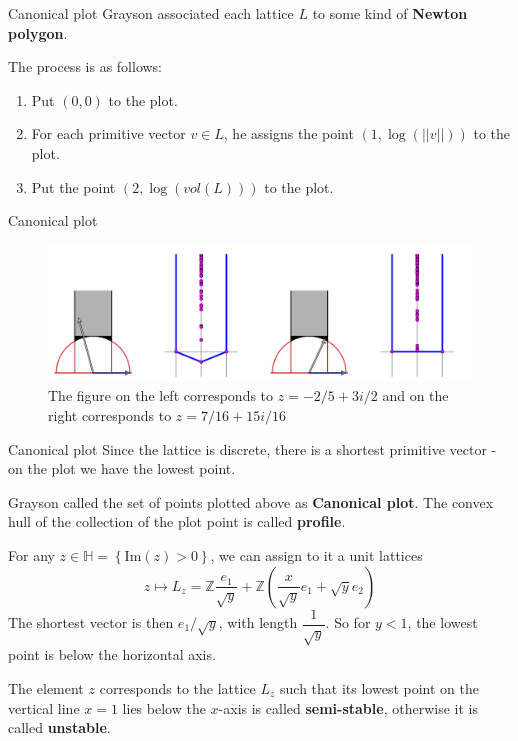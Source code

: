 \documentclass[pdf]{beamer}
\begin{document}
\begin{frame}{Canonical plot}
    Grayson associated each lattice $L$ to some kind of \textbf{Newton polygon}. \pause

    The process is as follows:
    \begin{enumerate}
        \item Put $(0,0)$ to the plot.
        \item For each primitive vector $v \in L$, he assigns the point $(1,\log(||v||))$ to the plot.
        \item Put the point $(2,\log(vol(L)))$ to the plot.
    \end{enumerate}
\end{frame}
\begin{frame}{Canonical plot}
    \begin{figure}[h]
        \includegraphics[width = \textwidth]{Canonical plot.png}
        \caption{The figure on the left corresponds to $z = -2/5 +3i/2$ and on the right corresponds to $z = 7/16+15i/16$}
    \end{figure}
\end{frame}
\begin{frame}{Canonical plot}
    Since the lattice is discrete, there is a shortest primitive vector - on the plot we have the lowest point.\pause\vspace{3em}

    Grayson called the set of points plotted above as \textbf{Canonical plot}. The convex hull of the collection
    of the plot point is called \textbf{profile}.
\end{frame}
\begin{frame}
    For any $z \in \mathbb{H} = \left\lbrace \text{Im}(z)>0 \right\rbrace$, we can assign to it a unit lattices
    \[z \mapsto L_z = \mathbb{Z}\dfrac{e_1}{\sqrt{y}} + \mathbb{Z}\left(\dfrac{x}{\sqrt{y}}e_1+\sqrt{y}e_2 \right)\]
    The shortest vector is then $ e_1/\sqrt{y}$, with length $\dfrac{1}{\sqrt{y}}$. So for $y<1$, the lowest
    point is below the horizontal axis.
    \pause \vspace{2em}

    The element $z$ corresponds to the lattice $L_z$ such that its lowest point on the
    vertical line $x=1$ lies below the $x$-axis is called \textbf{semi-stable}, otherwise it is called \textbf{unstable}.
\end{frame}
\end{document}
